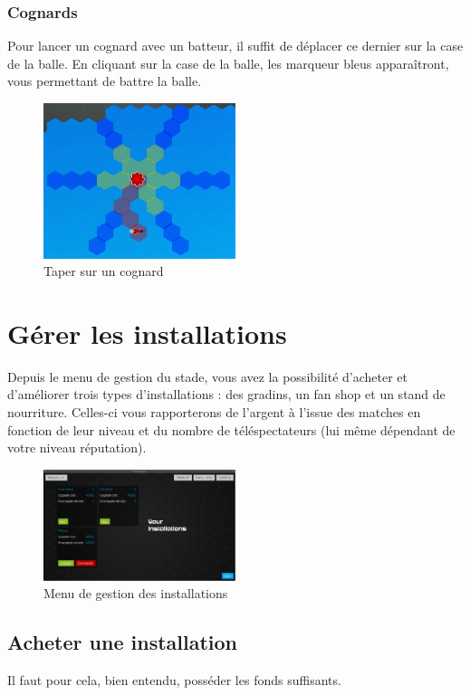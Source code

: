 \subsubsection{Cognards}
Pour lancer un cognard avec un batteur, il suffit de déplacer ce dernier sur la case de la balle. En cliquant sur la case de la balle, les marqueur bleus apparaîtront, vous permettant de battre la balle.

\begin{figure}[h!]
    \centering
    \includegraphics[width=0.5\textwidth]{../screenshots/throw_bludger.png}
    \caption{\label{manual:throw_bludger} Taper sur un cognard}
\end{figure}


\section{Gérer les installations}
Depuis le menu de gestion du stade, vous avez la possibilité d'acheter et d'améliorer trois types 
d'installations : des gradins, un fan shop et un stand de nourriture. Celles-ci vous rapporterons 
de l'argent à l'issue des matches en fonction de leur niveau et du nombre de téléspectateurs (lui
même dépendant de votre niveau réputation).

\begin{figure}[h!]
    \centering
    \includegraphics[width=0.5\textwidth]{../screenshots/installation_manager.png}
    \caption{\label{manual:installation} Menu de gestion des installations}
\end{figure}

\subsection{Acheter une installation}
Il faut pour cela, bien entendu, posséder les fonds suffisants.

